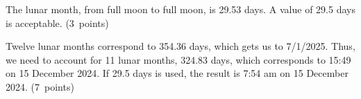 The lunar month, from full moon to full moon, is 29.53 days. A value of 29.5 days is acceptable.
\hfill\mbox{(3 points)}

Twelve lunar months correspond to 354.36 days, which gets us to 7/1/2025. Thus, we need to account for
11 lunar months, 324.83 days, which corresponds to 15:49 on 15 December 2024.
If 29.5 days is used, the result is 7:54 am on 15 December 2024. \hfill\mbox{(7 points)}
